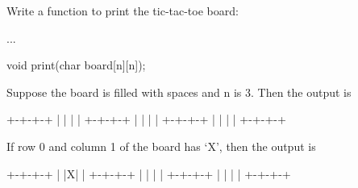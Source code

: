 \begin{ex}
Write a function to print the tic-tac-toe board:

\begin{consolethree}
...

void print(char board[n][n]);
\end{consolethree}

Suppose the board is filled with spaces and n is 3. Then the output is

\begin{consolethree}
+-+-+-+
| | | |
+-+-+-+
| | | |
+-+-+-+
| | | |
+-+-+-+ 
\end{consolethree}

If row 0 and column 1 of the board has `X', then the output is

\begin{consolethree}
+-+-+-+
| |X| |
+-+-+-+
| | | |
+-+-+-+
| | | |           
+-+-+-+
\end{consolethree}
\end{ex}
